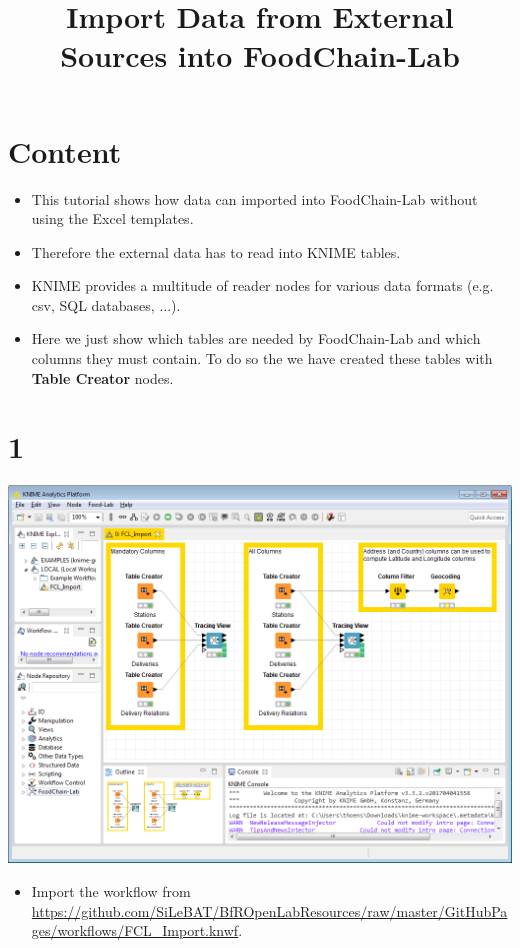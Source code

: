 \documentclass{beamer}
\title{Import Data from External Sources into FoodChain-Lab}
\date{}
\begin{document}
\maketitle

\section{Content}
\begin{frame}
	\begin{itemize}
		\item This tutorial shows how data can imported into FoodChain-Lab without using the Excel templates.
		\item Therefore the external data has to read into KNIME tables.
		\item KNIME provides a multitude of reader nodes for various data formats (e.g. csv, SQL databases, ...).
		\item Here we just show which tables are needed by FoodChain-Lab and which columns they must contain. To do so the we have created these tables with \textbf{Table Creator} nodes.
	\end{itemize}
\end{frame}
 
\section{1}
\begin{frame}
	\begin{center}
  		\includegraphics[height=0.6\textheight]{1.png}
	\end{center}
	\begin{itemize}
		\item Import the workflow from \url{https://github.com/SiLeBAT/BfROpenLabResources/raw/master/GitHubPages/workflows/FCL_Import.knwf}.
	\end{itemize}
\end{frame}
\end{document}
